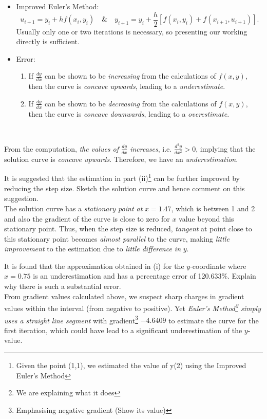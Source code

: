 \documentclass[oneside]{book}
\begin{document}
    \begin{stbox}{}
      \setcounter{enumi}{1}
    \begin{itemize}
    \item Improved Euler's Method: 
    \[u_{i+1}=y_i+hf(x_i,y_i)\quad\&\quad y_{i+1}=y_i+\frac{h}{2}[f(x_i,y_i)+f(x_{i+1},u_{i+1})].\]
    Usually only one or two iterations is necessary, so presenting our working directly is sufficient.
    \item Error:
    \begin{enumerate}
      \item If \(\frac{dy}{dx}\) can be shown to be \emph{increasing} from the calculations of \(f(x,y)\), then the curve is \emph{concave upwards}, leading to a \emph{underestimate}.
      \item If \(\frac{dy}{dx}\) can be shown to be \emph{decreasing} from the calculations of \(f(x,y)\), then the curve is \emph{concave downwards}, leading to a \emph{overestimate}.
    \end{enumerate}
  \end{itemize}
\end{stbox} ~
\begin{example}{}{}
  From the computation, \emph{the values of} \(\frac{dy}{dx}\) \emph{increases}, i.e. \(\frac{d^2y}{dx^2}>0\), implying that the solution curve is \emph{concave upwards}. Therefore, we have an \emph{underestimation}. 
\end{example}
\begin{example}{}{}
  It is suggested that the estimation in part (ii)\footnote{Given the point (1,1), we estimated the value of y(2) using the Improved Euler's Method} can be further improved by reducing the step size. Sketch the solution curve and hence comment on this suggestion.\\[3mm]
  The solution curve has a \emph{stationary point at} \(x=1.47\), which is between 1 and 2 and also the gradient of the curve is close to zero for \(x\) value beyond this stationary point. Thus, when the step size is reduced, \emph{tangent} at point close to this stationary point becomes \emph{almost parallel} to the curve, making \emph{little improvement} to the estimation due to \emph{little difference in} \(y\). 
\end{example}
\begin{example}{}{}
  It is found that the approximation obtained in (i) for the \(y\)-coordinate where \(x=0.75\) is an underestimation and has a percentage error of 120.633\%. Explain why there is such a substantial error.\\[3mm]
  From gradient values calculated above, we suspect sharp charges in gradient values within the interval (from negative to positive). Yet \emph{Euler's Method\footnote{We are explaining what it does} simply uses a straight line segment} with gradient\footnote{Emphasising negative gradient (Show its value)} \(-4.6409\) to estimate the curve for the first iteration, which could have lead to a significant underestimation of the \(y\)-value.
\end{example}
\end{document}
